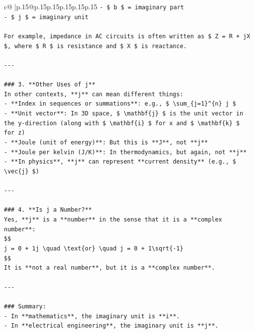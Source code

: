 \documentclass{article}
\begin{document}
{\begin{supertabular}{c@{$\;$}|p{.15\linewidth}@{}p{.15\linewidth}p{.15\linewidth}p{.15\linewidth}p{.15\linewidth}p{.15\linewidth}}
{{{\texttt{{-} \$ b \$ = imaginary part} \\
\texttt{{-} \$ j \$ = imaginary unit} \\
\\ 
\texttt{For example, impedance in AC circuits is often written as \$ Z = R + jX \$, where \$ R \$ is resistance and \$ X \$ is reactance.} \\
\\ 
\texttt{{-}{-}{-}} \\
\\ 
\texttt{\#\#\# 3. **Other Uses of j**} \\
\texttt{In other contexts, **j** can mean different things:} \\
\texttt{{-} **Index in sequences or summations**: e.g., \$ \textbackslash{}sum\_\{j=1\}\^{}\{n\} j \$} \\
\texttt{{-} **Unit vector**: In 3D space, \$ \textbackslash{}mathbf\{j\} \$ is the unit vector in the y{-}direction (along with \$ \textbackslash{}mathbf\{i\} \$ for x and \$ \textbackslash{}mathbf\{k\} \$ for z)} \\
\texttt{{-} **Joule (unit of energy)**: But this is **J**, not **j**} \\
\texttt{{-} **Joule per kelvin (J/K)**: In thermodynamics, but again, not **j**} \\
\texttt{{-} **In physics**, **j** can represent **current density** (e.g., \$ \textbackslash{}vec\{j\} \$)} \\
\\ 
\texttt{{-}{-}{-}} \\
\\ 
\texttt{\#\#\# 4. **Is j a Number?**} \\
\texttt{Yes, **j** is a **number** in the sense that it is a **complex number**:} \\
\texttt{\$\$} \\
\texttt{j = 0 + 1j \textbackslash{}quad \textbackslash{}text\{or\} \textbackslash{}quad j = 0 + 1\textbackslash{}sqrt\{{-}1\}} \\
\texttt{\$\$} \\
\texttt{It is **not a real number**, but it is a **complex number**.} \\
\\ 
\texttt{{-}{-}{-}} \\
\\ 
\texttt{\#\#\# Summary:} \\
\texttt{{-} In **mathematics**, the imaginary unit is **i**.} \\
\texttt{{-} In **electrical engineering**, the imaginary unit is **j**.} \\
}}}
\end{supertabular}}
\end{document}
